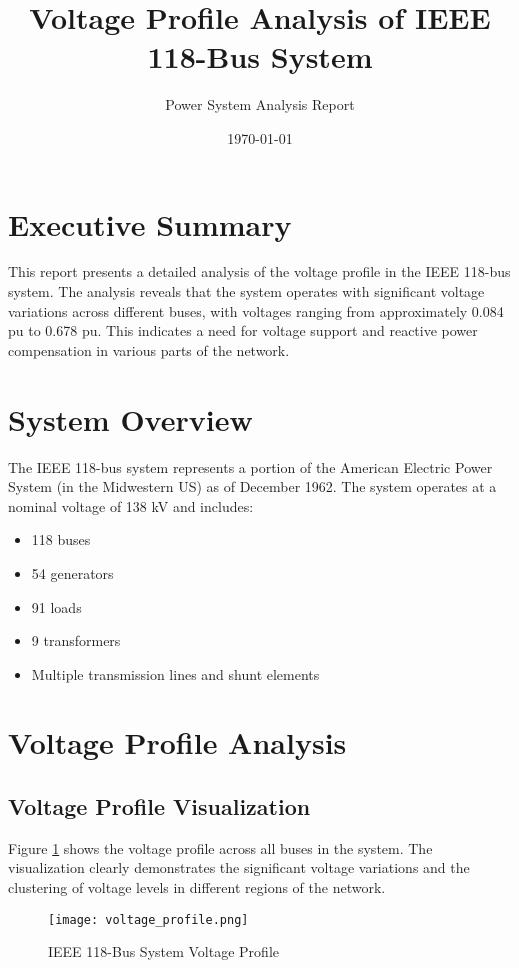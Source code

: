 \documentclass[11pt]{article}
\title{Voltage Profile Analysis of IEEE 118-Bus System}
\author{Power System Analysis Report}
\date{\today}
\begin{document}
\maketitle

\section{Executive Summary}
This report presents a detailed analysis of the voltage profile in the IEEE 118-bus system. The analysis reveals that the system operates with significant voltage variations across different buses, with voltages ranging from approximately 0.084 pu to 0.678 pu. This indicates a need for voltage support and reactive power compensation in various parts of the network.

\section{System Overview}
The IEEE 118-bus system represents a portion of the American Electric Power System (in the Midwestern US) as of December 1962. The system operates at a nominal voltage of 138 kV and includes:
\begin{itemize}
    \item 118 buses
    \item 54 generators
    \item 91 loads
    \item 9 transformers
    \item Multiple transmission lines and shunt elements
\end{itemize}

\section{Voltage Profile Analysis}

\subsection{Voltage Profile Visualization}
Figure \ref{fig:voltage_profile} shows the voltage profile across all buses in the system. The visualization clearly demonstrates the significant voltage variations and the clustering of voltage levels in different regions of the network.

\begin{figure}[H]
    \centering
    \texttt{[image: voltage\_profile.png]}
    \caption{IEEE 118-Bus System Voltage Profile}
    \label{fig:voltage_profile}
\end{figure}
\end{document}
